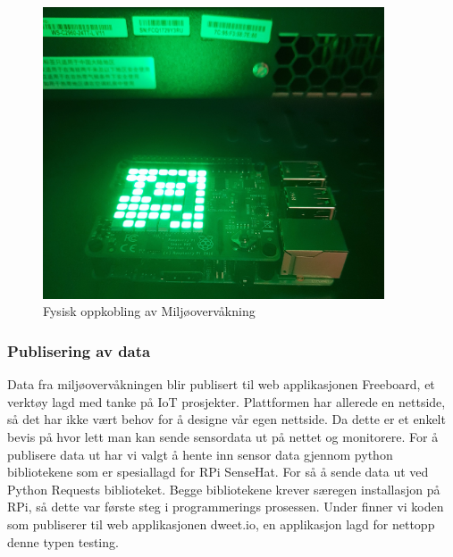 \documentclass{article}
\begin{document}
\begin{figure}
  \centering
      \includegraphics[width=0.9\textwidth]{rpimiljo1}
  \caption{Fysisk oppkobling av Miljøovervåkning}
\end{figure}

\subsubsection{Publisering av data}
Data fra miljøovervåkningen blir publisert til web applikasjonen Freeboard, et verktøy lagd med tanke på IoT prosjekter. Plattformen har allerede en nettside, så det har ikke vært behov for å designe vår egen nettside. Da dette er et enkelt bevis på hvor lett man kan sende sensordata ut på nettet og monitorere. For å publisere data ut har vi valgt å hente inn sensor data gjennom python bibliotekene som er spesiallagd for RPi SenseHat. For så å sende data ut ved Python Requests biblioteket. Begge bibliotekene krever særegen installasjon på RPi, så dette var første steg i programmerings prosessen. Under finner vi koden som publiserer til web applikasjonen dweet.io, en applikasjon lagd for nettopp denne typen testing.
\end{document}
